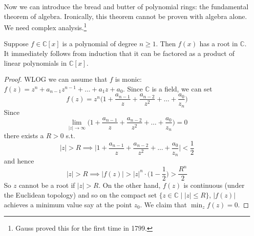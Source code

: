  Now we can introduce the bread and butter of polynomial rings: the fundamental theorem of algebra. Ironically, this theorem cannot be proven with algebra alone. We need complex analysis.\footnote{Gauss proved this for the first time in 1799.} 

  \begin{theorem}
    Suppose $f \in \mathbb{C}[x]$ is a polynomial of degree $n \geq 1$. Then $f(x)$ has a root in $\mathbb{C}$. It immediately follows from induction that it can be factored as a product of linear polynomials in $\mathbb{C}[x]$. 
  \end{theorem}
  \begin{proof}
    WLOG we can assume that $f$ is monic: $f(z) = z^n + a_{n-1} z^{n-1} + \ldots + a_1 z + a_0$. Since $\mathbb{C}$ is a field, we can set 
    \begin{equation}
      f(z) = z^n \bigg( 1 + \frac{a_{n-1}}{z} + \frac{a_{n-2}}{z^2} + \ldots + \frac{a_0}{z_n} \bigg)
    \end{equation} 
    Since 
    \begin{equation}
      \lim_{|z| \rightarrow \infty} \bigg( 1 + \frac{a_{n-1}}{z} + \frac{a_{n-2}}{z^2} + \ldots + \frac{a_0}{z_n} \bigg) = 0
    \end{equation}
    there exists a $R > 0$ s.t. 
    \begin{equation}
      |z| > R \implies \bigg| 1 + \frac{a_{n-1}}{z} + \frac{a_{n-2}}{z^2} + \ldots + \frac{a_0}{z_n} \bigg| < \frac{1}{2}
    \end{equation}
    and hence 
    \begin{equation}
      |z| > R \implies |f(z)| > |z|^n \cdot \bigg( 1 - \frac{1}{2} \bigg) > \frac{R^n}{2}
    \end{equation}
    So $z$ cannot be a root if $|z| > R$. On the other hand, $f(z)$ is continuous (under the Euclidean topology) and so on the compact set $\{z \in \mathbb{C} \mid |z| \leq R\}$, $|f(z)|$ achieves a minimum value say at the point $z_0$. We claim that $\min_z f(z) = 0$. 


\end{proof}
